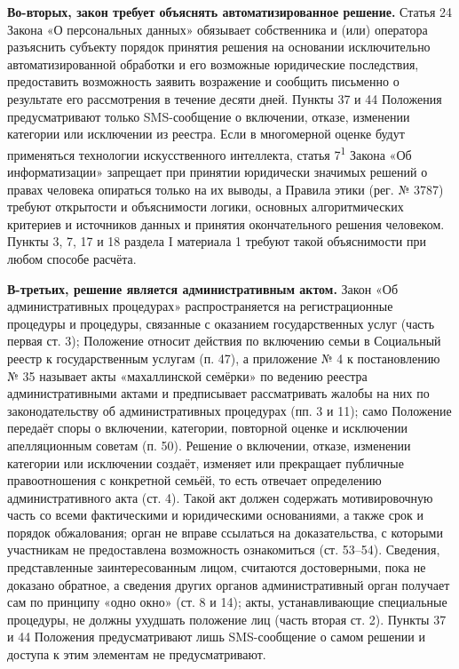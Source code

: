 \documentclass[14pt,a4paper]{extarticle}
\begin{document}
\textbf{Во-вторых, закон требует объяснять автоматизированное решение.} Статья 24 Закона «О персональных данных» обязывает собственника и (или) оператора разъяснить субъекту порядок принятия решения на основании исключительно автоматизированной обработки и его возможные юридические последствия, предоставить возможность заявить возражение и сообщить письменно о результате его рассмотрения в течение десяти дней\cite{pdlaw}. Пункты 37 и 44 Положения предусматривают только SMS-сообщение о включении, отказе, изменении категории или исключении из реестра\cite{res35}. Если в многомерной оценке будут применяться технологии искусственного интеллекта, статья 7\textsuperscript{1} Закона «Об информатизации» запрещает при принятии юридически значимых решений о правах человека опираться только на их выводы, а Правила этики (рег. № 3787) требуют открытости и объяснимости логики, основных алгоритмических критериев и источников данных и принятия окончательного решения человеком\cite{inform,ethics}. Пункты 3, 7, 17 и 18 раздела I материала 1 требуют такой объяснимости при любом способе расчёта.

\textbf{В-третьих, решение является административным актом.} Закон «Об административных процедурах» распространяется на регистрационные процедуры и процедуры, связанные с оказанием государственных услуг (часть первая ст. 3); Положение относит действия по включению семьи в Социальный реестр к государственным услугам (п. 47), а приложение № 4 к постановлению № 35 называет акты «махаллинской семёрки» по ведению реестра административными актами и предписывает рассматривать жалобы на них по законодательству об административных процедурах (пп. 3 и 11); само Положение передаёт споры о включении, категории, повторной оценке и исключении апелляционным советам (п. 50)\cite{res35}. Решение о включении, отказе, изменении категории или исключении создаёт, изменяет или прекращает публичные правоотношения с конкретной семьёй, то есть отвечает определению административного акта (ст. 4). Такой акт должен содержать мотивировочную часть со всеми фактическими и юридическими основаниями, а также срок и порядок обжалования; орган не вправе ссылаться на доказательства, с которыми участникам не предоставлена возможность ознакомиться (ст. 53–54). Сведения, представленные заинтересованным лицом, считаются достоверными, пока не доказано обратное, а сведения других органов административный орган получает сам по принципу «одно окно» (ст. 8 и 14); акты, устанавливающие специальные процедуры, не должны ухудшать положение лиц (часть вторая ст. 2)\cite{apl}. Пункты 37 и 44 Положения предусматривают лишь SMS-сообщение о самом решении и доступа к этим элементам не предусматривают.
\end{document}
